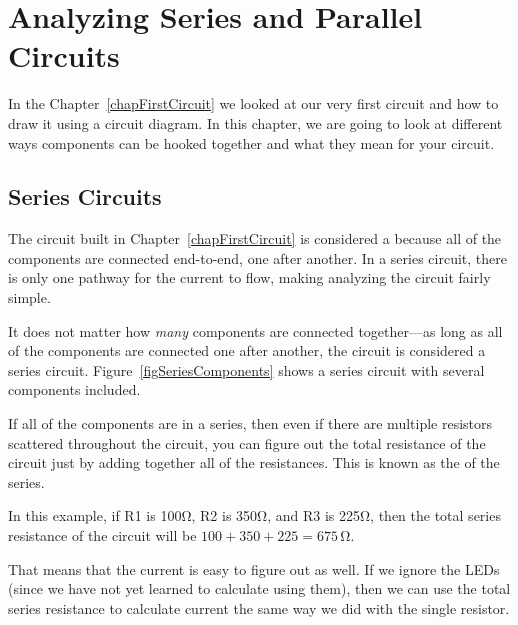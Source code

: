 \chapter{Analyzing Series and Parallel Circuits}
\label{chSeriesParallel}



In the Chapter~\ref{chapFirstCircuit} we looked at our very first circuit and how to draw it using a circuit diagram.
In this chapter, we are going to look at different ways components can be hooked together and what they mean for your circuit.

\section{Series Circuits}

The circuit built in Chapter~\ref{chapFirstCircuit} is considered a  because all of the components are connected end-to-end, one after another.
In a series circuit, there is only one pathway for the current to flow, making analyzing the circuit fairly simple.

It does not matter how \emph{many} components are connected together---as long as all of the components are connected one after another, the circuit is considered a series circuit.
Figure~\ref{figSeriesComponents} shows a series circuit with several components included.


If all of the components are in a series, then even if there are multiple resistors scattered throughout the circuit, you can figure out the total resistance of the circuit just by adding together all of the resistances.
This is known as the  of the series.

In this example, if R1 is 100\si{\ohm}, R2 is 350\si{\ohm}, and R3 is 225\si{\ohm}, then the total series resistance of the circuit will be $100 + 350 + 225 = 675\,\si{\ohm}$.

That means that the current is easy to figure out as well.
If we ignore the LEDs (since we have not yet learned to calculate using them), then we can use the total series resistance to calculate current the same way we did with the single resistor.

